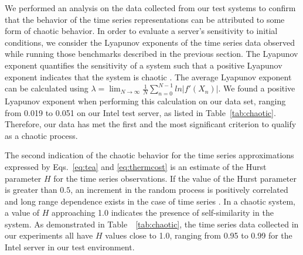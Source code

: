 \documentclass[times, 10pt,twocolumn]{IEEEtran}
\begin{document}
We performed an analysis on the data collected from our test systems to
confirm that the behavior of the time series representations can be
attributed to some form of chaotic behavior.  In order to evaluate a
server's sensitivity to initial conditions, we consider the Lyapunov
exponents of the time series data observed while running those
benchmarks described in the previous section.  The Lyapunov exponent
quantifies the sensitivity of a system such that a positive Lyapunov
exponent indicates that the system is chaotic \cite{Sprott2003}.  The
average Lyapunov exponent can be calculated using $\lambda =
\lim_{N\to\infty}\frac{1}{N}\sum_{n=0}^{N-1}ln|f'(X_n)|$.  We found a
positive Lyapunov exponent when performing this calculation on our data
set, ranging from 0.019 to 0.051 on our Intel test server, as listed in
Table~\ref{tab:chaotic}. Therefore, our data has met the first and the
most significant criterion to qualify as a chaotic process.

The second indication of the chaotic behavior for the time series
approximations expressed by Eqs.~\eqref{eq:tea} and
\eqref{eq:thermcost} is an estimate of the Hurst parameter $H$ for the
time series observations. If the value of the Hurst
parameter is greater than $0.5$, an increment in the random process is
positively correlated and long range dependence exists in the case of
time series \cite{Sprott2003}.  In a chaotic system, a value of $H$ approaching 1.0
indicates the presence of self-similarity in the system.  As
demonstrated in Table~~\ref{tab:chaotic}, the time series data collected
in our experiments all have $H$ values close to 1.0, ranging from
0.95 to 0.99 for the Intel server in our test environment.
\begin{table}[tbhp]
  \caption{Chaotic behavior in core die temperature time series}
  \label{tab:chaotic} 
   \centering 

\end{table}
\end{document}
